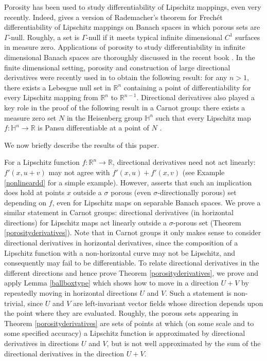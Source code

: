 \documentclass[reqno, 11pt]{amsart}
\theoremstyle{definition}
\theoremstyle{remark}
\numberwithin{theorem}{section}
\numberwithin{equation}{section}
\begin{document}
Porosity has been used to study differentiability of Lipschitz mappings, even very recently. Indeed, \cite{LP03} gives a version of Rademacher's theorem for Frech\'{e}t differentiability of Lipschitz mappings on Banach spaces in which porous sets are $\Gamma$-null. Roughly, a set is $\Gamma$-null if it meets typical infinite dimensional $C^1$ surfaces in measure zero. Applications of porosity to study differentiability in infinite dimensional Banach spaces are thoroughly discussed in the recent book \cite{LPT12}. In the finite dimensional setting, porosity and construction of large directional derivatives were recently used in \cite{PS15} to obtain the following result: for any $n>1$, there exists a Lebesgue null set in $\mathbb{R}^{n}$ containing a point of differentiability for every Lipschitz mapping from $\mathbb{R}^{n}$ to $\mathbb{R}^{n-1}$. Directional derivatives also played a key role in the proof of the following result in a Carnot group: there exists a measure zero set $N$ in the Heisenberg group $\mathbb{H}^{n}$ such that every Lipschitz map $f\colon \mathbb{H}^{n}\to \mathbb{R}$ is Pansu differentiable at a point of $N$ \cite{PinS15}.

We now briefly describe the results of this paper. 

For a Lipschitz function $f\colon \mathbb{R}^{n}\to \mathbb{R}$, directional derivatives need not act linearly: $f'(x,u+v)$ may not agree with $f'(x,u)+f'(x,v)$ (see Example \ref{nonlineardd} for a simple example). However, \cite[Theorem 2]{PZ01} asserts that such an implication does hold at points $x$ outside a $\sigma$ porous (even $\sigma$-directionally porous) set depending on $f$, even for Lipschitz maps on separable Banach spaces. We prove a similar statement in Carnot groups: directional derivatives (in horizontal directions) for Lipschitz maps act linearly outside a $\sigma$-porous set (Theorem \ref{porosityderivatives}). Note that in Carnot groups it only makes sense to consider directional derivatives in horizontal derivatives, since the composition of a Lipschitz function with a non-horizontal curve may not be Lipschitz, and consequently may fail to be differentiable. To relate directional derivatives in the different directions and hence prove Theorem \ref{porosityderivatives}, we prove and apply Lemma \ref{ballboxtype} which shows how to move in a direction $U+V$ by repeatedly moving in horizontal directions $U$ and $V$. Such a statement is non-trivial, since $U$ and $V$ are left-invariant vector fields whose direction depends upon the point where they are evaluated. Roughly, the porous sets appearing in Theorem \ref{porosityderivatives} are sets of points at which (on some scale and to some specified accuracy) a Lipschitz function is approximated by directional derivatives in directions $U$ and $V$, but is not well approximated by the sum of the directional derivatives in the direction $U+V$. 
\end{document}
